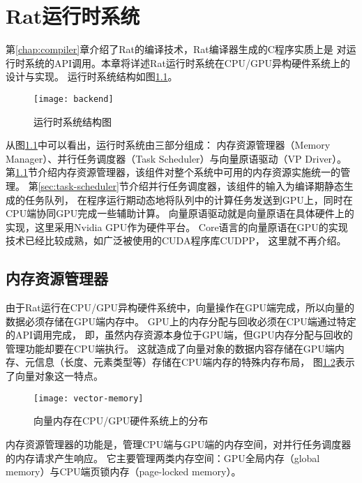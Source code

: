 \chapter{Rat运行时系统}
第\ref{chap:compiler}章介绍了Rat的编译技术，Rat编译器生成的C程序实质上是
对运行时系统的API调用。本章将详述Rat运行时系统在CPU/GPU异构硬件系统上的设计与实现。
运行时系统结构如图\ref{fig:backend}。
\begin{figure}
  \centering
  \texttt{[image: backend]}
  \caption{运行时系统结构图}
  \label{fig:backend}
\end{figure}

从图\ref{fig:backend}中可以看出，运行时系统由三部分组成：
内存资源管理器（Memory Manager）、并行任务调度器（Task Scheduler）与向量原语驱动（VP Driver）。
第\ref{sec:memory-manager}节介绍内存资源管理器，该组件对整个系统中可用的内存资源实施统一的管理。
第\ref{sec:task-scheduler}节介绍并行任务调度器，该组件的输入为编译期静态生成的任务队列，
在程序运行期动态地将队列中的计算任务发送到GPU上，同时在CPU端协同GPU完成一些辅助计算。
向量原语驱动就是向量原语在具体硬件上的实现，这里采用Nvidia GPU作为硬件平台。
Core语言的向量原语在GPU的实现技术已经比较成熟，如广泛被使用的CUDA程序库CUDPP，
这里就不再介绍。

\section{内存资源管理器}\label{sec:memory-manager}
由于Rat运行在CPU/GPU异构硬件系统中，向量操作在GPU端完成，所以向量的数据必须存储在GPU端内存中。
GPU上的内存分配与回收必须在CPU端通过特定的API调用完成，
即，虽然内存资源本身位于GPU端，但GPU内存分配与回收的管理功能却要在CPU端执行。
这就造成了向量对象的数据内容存储在GPU端内存、元信息（长度、元素类型等）存储在CPU端内存的特殊内存布局，
图\ref{fig:vector-memory}表示了向量对象这一特点。
\begin{figure}
  \centering
  \texttt{[image: vector-memory]}
  \caption[向量内存分布]{向量内存在CPU/GPU硬件系统上的分布}
  \label{fig:vector-memory}
\end{figure}

内存资源管理器的功能是，管理CPU端与GPU端的内存空间，对并行任务调度器的内存请求产生响应。
它主要管理两类内存空间：GPU全局内存（global memory）与CPU端页锁内存（page-locked memory）。

